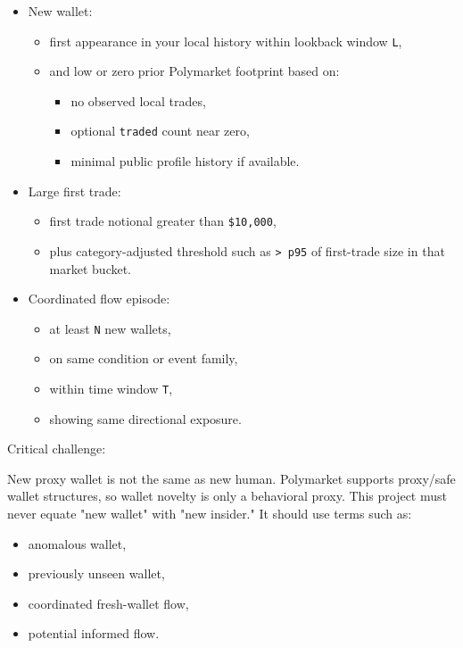 \documentclass[
]{article}
\providecommand{\tightlist}{%
  \setlength{\itemsep}{0pt}\setlength{\parskip}{0pt}}
\begin{document}
\begin{itemize}
\tightlist
\item
  New wallet:

  \begin{itemize}
  \tightlist
  \item
    first appearance in your local history within lookback window
    \texttt{L},
  \item
    and low or zero prior Polymarket footprint based on:

    \begin{itemize}
    \tightlist
    \item
      no observed local trades,
    \item
      optional \texttt{traded} count near zero,
    \item
      minimal public profile history if available.
    \end{itemize}
  \end{itemize}
\item
  Large first trade:

  \begin{itemize}
  \tightlist
  \item
    first trade notional greater than \texttt{\$10,000},
  \item
    plus category-adjusted threshold such as
    \texttt{\textgreater{}\ p95} of first-trade size in that market
    bucket.
  \end{itemize}
\item
  Coordinated flow episode:

  \begin{itemize}
  \tightlist
  \item
    at least \texttt{N} new wallets,
  \item
    on same condition or event family,
  \item
    within time window \texttt{T},
  \item
    showing same directional exposure.
  \end{itemize}
\end{itemize}

Critical challenge:

New proxy wallet is not the same as new human. Polymarket supports
proxy/safe wallet structures, so wallet novelty is only a behavioral
proxy. This project must never equate "new wallet" with "new insider."
It should use terms such as:

\begin{itemize}
\tightlist
\item
  anomalous wallet,
\item
  previously unseen wallet,
\item
  coordinated fresh-wallet flow,
\item
  potential informed flow.
\end{itemize}
\end{document}
